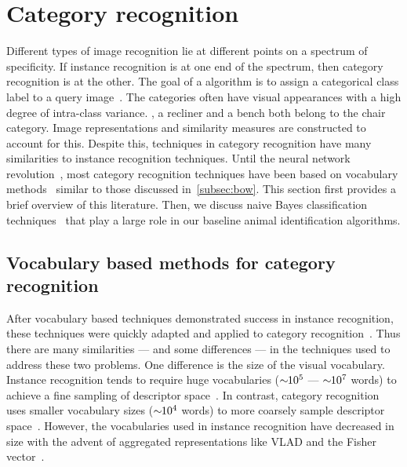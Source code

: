 \section{Category recognition}\label{sec:cr}  

    Different types of image recognition lie at different points on a spectrum of specificity.
    If instance recognition is at one end of the spectrum, then category recognition is at the other.
    The goal of a  algorithm is to assign a categorical class label to a query
      image~\cite{everingham_pascal_2010, everingham_pascal_2015, russakovsky_imagenet_2014, deng_imagenet_2009,
      fei_fei_one_shot_2006, griffin_caltech_256_2007}.
    The categories often have visual appearances with a high degree of intra-class variance.
    \Eg{}, a recliner and a bench both belong to the chair category.
    Image representations and similarity measures are constructed to account for this.
    Despite this, techniques in category recognition have many similarities to instance recognition techniques.
    Until the neural network revolution~\cite{krizhevsky_imagenet_2012}, most category recognition techniques
      have been based on vocabulary methods~\cite{csurka_visual_2004, yang_linear_2009, sanchez_compressed_2013,
      russakovsky_imagenet_2014, krizhevsky_imagenet_2012} similar to those discussed in~\cref{subsec:bow}.
    This section first provides a brief overview of this literature.
    Then, we discuss naive Bayes classification techniques~\cite{boiman_defense_2008,mccann_local_2012} that play
      a large role in our baseline animal identification algorithms.

    \subsection{Vocabulary based methods for category recognition}
        After vocabulary based techniques demonstrated success in instance recognition, these techniques were
          quickly adapted and applied to category recognition~\cite{csurka_visual_2004}.
        Thus there are many similarities --- and some differences --- in the techniques used to address these two
          problems.
        One difference is the size of the visual vocabulary.
        Instance recognition tends to require huge vocabularies ($\sim\mkern-6mu 10^{5}$ --- $\sim\mkern-6mu 10^{7}$ words)
          to achieve a fine sampling of descriptor space~\cite{nister_scalable_2006, philbin_object_2007}.
        In contrast, category recognition uses smaller vocabulary sizes ($\sim\mkern-6mu 10^{4}$ words) to more
          coarsely sample descriptor space~\cite{zhang_local_2006}.
        However, the vocabularies used in instance recognition have decreased in size with the advent of
          aggregated representations like VLAD and the Fisher vector~\cite{arandjelovic_all_2013,
          sanchez_compressed_2013}.

